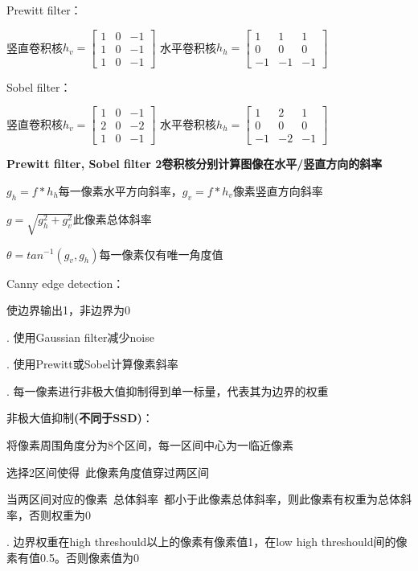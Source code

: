 \documentclass[UTF8]{ctexart}
\begin{document}
  Prewitt filter：

  \quad 竖直卷积核$h_v = \begin{bmatrix}
    1 & 0 & -1 \\
    1 & 0 & -1 \\
    1 & 0 & -1
    \end{bmatrix}$
    水平卷积核$h_h = \begin{bmatrix}
      1 & 1 & 1 \\
      0 & 0 & 0 \\
      -1 & -1 & -1
      \end{bmatrix}$

  Sobel filter：

  \quad 竖直卷积核$h_v = \begin{bmatrix}
    1 & 0 & -1 \\
    2 & 0 & -2 \\
    1 & 0 & -1
    \end{bmatrix}$
    水平卷积核$h_h = \begin{bmatrix}
      1 & 2 & 1 \\
      0 & 0 & 0 \\
      -1 & -2 & -1
      \end{bmatrix}$

  \textbf{Prewitt filter, Sobel filter 2卷积核分别计算图像在水平/竖直方向的斜率}

  \quad $g_h = f * h_h$每一像素水平方向斜率，$g_v = f * h_v$像素竖直方向斜率

  \quad $g = \sqrt{g_h^2 + g_v^2}$此像素总体斜率

  \quad $\theta = tan^{-1}(g_v, g_h)$每一像素仅有唯一角度值

  Canny edge detection：

  \quad 使边界输出1，非边界为0

  . 使用Gaussian filter减少noise

  . 使用Prewitt或Sobel计算像素斜率

  . 每一像素进行非极大值抑制得到单一标量，代表其为边界的权重

  \quad \quad 非极大值抑制\textbf{(不同于SSD)}：

  \quad \quad \quad 将像素周围角度分为8个区间，每一区间中心为一临近像素

  \quad \quad \quad 选择2区间使得\ 此像素角度值穿过两区间

  \quad \quad \quad 当两区间对应的像素\ 总体斜率\ 都小于此像素总体斜率，则此像素有权重为总体斜率，否则权重为0

  . 边界权重在high threshould以上的像素有像素值1，在low high threshould间的像素有值0.5。否则像素值为0
\end{document}
